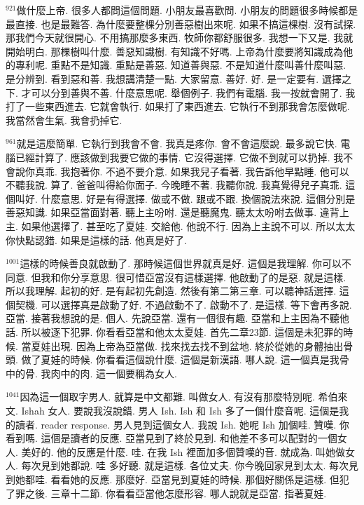 \documentclass{book}
\begin{document}
$^{921}$做什麼上帝.
很多人都問這個問題.
小朋友最喜歡問.
小朋友的問題很多時候都是最直接.
也是最難答.
為什麼要整棵分別善惡樹出來呢.
如果不搞這棵樹.
沒有試探.
那我們今天就很開心.
不用搞那麼多東西.
牧師你都舒服很多.
我想一下又是.
我就開始明白.
那棵樹叫什麼.
善惡知識樹.
有知識不好嗎.
上帝為什麼要將知識成為他的專利呢.
重點不是知識.
重點是善惡.
知道善與惡.
不是知道什麼叫善什麼叫惡.
是分辨到.
看到惡和善.
我想講清楚一點.
大家留意.
善好.
好.
是一定要有.
選擇之下.
才可以分到善與不善.
什麼意思呢.
舉個例子.
我們有電腦.
我一按就會開了.
我打了一些東西進去.
它就會執行.
如果打了東西進去.
它執行不到那我會怎麼做呢.
我當然會生氣.
我會扔掉它.

$^{961}$就是這麼簡單.
它執行到我會不會.
我真是疼你.
會不會這麼說.
最多說它快.
電腦已經計算了.
應該做到我要它做的事情.
它沒得選擇.
它做不到就可以扔掉.
我不會說你真乖.
我抱著你.
不過不要介意.
如果我兒子看著.
我告訴他早點睡.
他可以不聽我說.
算了.
爸爸叫得給你面子.
今晚睡不著.
我聽你說.
我真覺得兒子真乖.
這個叫好.
什麼意思.
好是有得選擇.
做或不做.
跟或不跟.
換個說法來說.
這個分別是善惡知識.
如果亞當面對著.
聽上主吩咐.
還是聽魔鬼.
聽太太吩咐去做事.
違背上主.
如果他選擇了.
甚至吃了夏娃.
交給他.
他說不行.
因為上主說不可以.
所以太太你快點認錯.
如果是這樣的話.
他真是好了.

$^{1001}$這樣的時候善良就啟動了.
那時候這個世界就真是好.
這個是我理解.
你可以不同意.
但我和你分享意思.
很可惜亞當沒有這樣選擇.
他啟動了的是惡.
就是這樣.
所以我理解.
起初的好.
是有起初先創造.
然後有第二第三章.
可以聽神話選擇.
這個契機.
可以選擇真是啟動了好.
不過啟動不了.
啟動不了.
是這樣.
等下會再多說.
亞當.
接著我想說的是.
個人.
先說亞當.
還有一個很有趣.
亞當和上主因為不聽他話.
所以被逐下犯罪.
你看看亞當和他太太夏娃.
首先二章23節.
這個是未犯罪的時候.
當夏娃出現.
因為上帝為亞當做.
找來找去找不到盆地.
終於從她的身體抽出骨頭.
做了夏娃的時候.
你看看這個說什麼.
這個是新漢語.
哪人說.
這一個真是我骨中的骨.
我肉中的肉.
這一個要稱為女人.

$^{1041}$因為這一個取字男人.
就算是中文都難.
叫做女人.
有沒有那麼特別呢.
希伯來文.
Ishah 女人.
要說我沒說錯.
男人 Ish.
Ish 和 Ish 多了一個什麼音呢.
這個是我的讀者.
reader response.
男人見到這個女人.
我說 Ish.
她呢 Ish 加個哇.
贊嘆.
你看到嗎.
這個是讀者的反應.
亞當見到了終於見到.
和他差不多可以配對的一個女人.
美好的.
他的反應是什麼.
哇.
在我 Ish 裡面加多個贊嘆的音.
就成為.
叫她做女人.
每次見到她都說.
哇 多好聽.
就是這樣.
各位丈夫.
你今晚回家見到太太.
每次見到她都哇.
看看她的反應.
那麼好.
亞當見到夏娃的時候.
那個好關係是這樣.
但犯了罪之後.
三章十二節.
你看看亞當他怎麼形容.
哪人說就是亞當.
指著夏娃.
\end{document}
